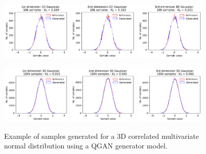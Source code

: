 \documentclass[twocolumn,preprintnumbers,superscriptaddress]{revtex4-2}
\begin{document}
\begin{figure}
  \includegraphics[width=0.3\textwidth]{plots/3Dgaussian_posdef/1-distribution_3dgaussian_10k.pdf}%
  \includegraphics[width=0.3\textwidth]{plots/3Dgaussian_posdef/2-distribution_3dgaussian_10k.pdf}%
  \includegraphics[width=0.3\textwidth]{plots/3Dgaussian_posdef/3-distribution_3dgaussian_10k.pdf}

  \includegraphics[width=0.3\textwidth]{plots/3Dgaussian_posdef/1-distribution_3dgaussian_100k.pdf}%
  \includegraphics[width=0.3\textwidth]{plots/3Dgaussian_posdef/2-distribution_3dgaussian_100k.pdf}%
  \includegraphics[width=0.3\textwidth]{plots/3Dgaussian_posdef/3-distribution_3dgaussian_100k.pdf}

  \caption{\label{fig:3dgauss}Example of samples generated for a 3D correlated
    multivariate normal distribution using a QGAN generator model.}
\end{figure}
\end{document}
